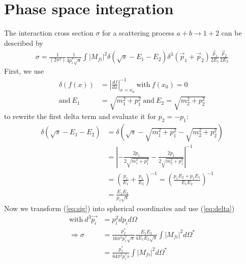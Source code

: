 \documentclass{article}
\begin{document}
\section{Phase space integration}
The interaction cross section \( \sigma \) for a scattering process
\( a+b \rightarrow 1+2 \) can be described by 
\begin{align}
    \label{eq:sig}
    \sigma = \frac{1}{(2 \pi ^2 )} \frac{1}{4 p_i^{*} \sqrt{s}} \int
    \left| M_{fi} \right|^2 \delta ( \sqrt{s} -E_1 - E_2 )
    \delta ^3 ( \vec p_1+\vec p_2 ) \frac{\vec p_1}{2 E_1} \frac{\vec p_2}{2 E_2}
\end{align}
First, we use
\begin{align}
    \delta(f(x)) &= \left| \frac{df}{dx} \right| ^{-1} _{x=x_0} \ \text{with}\ f(x_0) = 0 \\
    \text{and} \ E_1 &= \sqrt{m_1^2+p_1^2} \ \text{and}\ E_2 = \sqrt{m _{2} ^{2} +p _{2}^{2} }
\end{align}
to rewrite the first delta term and evaluate it for \( p_2 = -p_1 \):
\begin{align}
    \delta \left( \sqrt{s} - E_1 - E_2 \right) &= \nonumber
    \delta \left( \sqrt{s} - \sqrt{m _{1}^2 + p_1^2 } - \sqrt{m _{2} ^{2} + p _{2} ^2} \right) \\
    &= \left| - \frac{2 p_1}{2 \sqrt{m_1^2 +p_1^2}} - \frac{2 p_1}{2 \sqrt{m_2^2 +p_1^2}} \nonumber
    \right| ^{-1} \\
    &= \left( \frac{p_1}{E_1} + \frac{p_1}{E_2} \right) ^{-1}
    = \left(\frac{ p_1E_2+p_1E_1}{E_1E_2} \right)^{-1} \nonumber
    \\ &= \frac{E_1 E_2}{p_1 \sqrt{s}}
    \label{eq:delta}
\end{align}
Now we transform (\ref{eq:sig}) into spherical coordinates and use (\ref{eq:delta})
\begin{align}
    \text{with} \ d^3 \vec{p_i} &= p_i^2 dp_i d \Omega \nonumber \\
    \Rightarrow \sigma &= \frac{p_f^{*}}{16 \pi ^2 p_i^{*} \sqrt{s}} 
    \frac{E_1E_2}{4 E_1E_2 \sqrt{s}} \int
    \left| M_{fi} \right|^2 d \Omega^{*} \nonumber \\
    &= \frac{p_f^{*}}{64 \pi ^2 p_i^{*} s} \int
    \left| M_{fi} \right|^2 d \Omega^{*}
\end{align}
\end{document}
